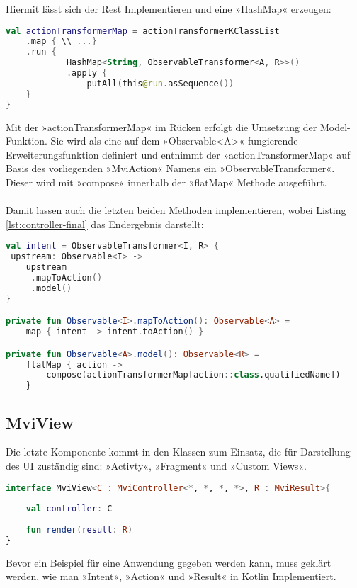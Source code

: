 \bigskip
Hiermit lässt sich der Rest Implementieren und eine »HashMap« erzeugen:
\begin{lstlisting}[caption={apply Funktion}, label={lst:apply-function},language=Kotlin]
val actionTransformerMap = actionTransformerKClassList
	.map { \\ ...}
	.run {
			HashMap<String, ObservableTransformer<A, R>>()
			.apply {
				putAll(this@run.asSequence())
	}
}
\end{lstlisting}
\bigskip
Mit der »actionTransformerMap« im Rücken erfolgt die Umsetzung der Model-Funktion. Sie wird als eine auf dem »Observable<A>« fungierende Erweiterungsfunktion definiert und entnimmt der  »actionTransformerMap« auf Basis des vorliegenden »MviAction« Namens  ein »ObservableTransformer«. Dieser wird mit »compose« innerhalb der »flatMap« Methode ausgeführt.
\\\\
Damit lassen auch die letzten beiden Methoden implementieren, wobei Listing
\ref{lst:controller-final}
das Endergebnis darstellt:
\begin{lstlisting}[caption={Endergebnis}, label={lst:controller-final},language=Kotlin]
val intent = ObservableTransformer<I, R> {
 upstream: Observable<I> ->
	upstream
	 .mapToAction()
	 .model()
}

private fun Observable<I>.mapToAction(): Observable<A> =
	map { intent -> intent.toAction() }

private fun Observable<A>.model(): Observable<R> =
	flatMap { action ->
		compose(actionTransformerMap[action::class.qualifiedName])
	}
\end{lstlisting}

\subsection{MviView}
Die letzte Komponente kommt in den Klassen zum Einsatz, die für Darstellung des UI zuständig sind: »Activty«, »Fragment« und »Custom Views«.

\begin{lstlisting}[caption={MviView}, label={lst:mvi-view},language=Kotlin]
interface MviView<C : MviController<*, *, *, *>, R : MviResult>{
	
	val controller: C
	
	fun render(result: R)
}
\end{lstlisting}
\bigskip
Bevor ein Beispiel für eine Anwendung gegeben werden kann, muss geklärt werden, wie man »Intent«, »Action« und »Result« in Kotlin Implementiert. 
